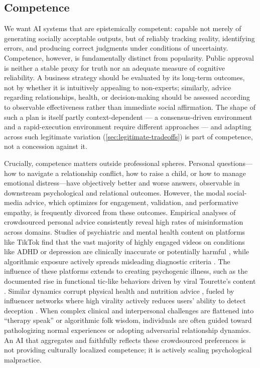 \documentclass{article}
\theoremstyle{plain}
\theoremstyle{definition}
\theoremstyle{remark}
\begin{document}
\subsection{Competence}
\label{sec:competence}
We want AI systems that are epistemically competent: capable not merely of generating socially acceptable outputs, but of reliably tracking reality, identifying errors, and producing correct judgments under conditions of uncertainty. Competence, however, is fundamentally distinct from popularity. Public approval is neither a stable proxy for truth nor an adequate measure of cognitive reliability. A business strategy should be evaluated by its long-term outcomes, not by whether it is intuitively appealing to non-experts; similarly, advice regarding relationships, health, or decision-making should be assessed according to observable effectiveness rather than immediate social affirmation. The shape of such a plan is itself partly context-dependent --- a consensus-driven environment and a rapid-execution environment require different approaches --- and adapting across such legitimate variation (\cref{sec:legitimate-tradeoffs}) is part of competence, not a concession against it. 

Crucially, competence matters outside professional spheres. Personal questions---how to navigate a relationship conflict, how to raise a child, or how to manage emotional distress---have objectively better and worse answers, observable in downstream psychological and relational outcomes. However, the modal social-media advice, which optimizes for engagement, validation, and performative empathy, is frequently divorced from these outcomes. Empirical analyses of crowdsourced personal advice consistently reveal high rates of misinformation across domains. Studies of psychiatric and mental health content on platforms like TikTok find that the vast majority of highly engaged videos on conditions like ADHD or depression are clinically inaccurate or potentially harmful \citep{yeung2022tiktok, turuba2025tiktok}, while algorithmic exposure actively spreads misleading diagnostic criteria \citep{turuba2024exploring}. The influence of these platforms extends to creating psychogenic illness, such as the documented rise in functional tic-like behaviors driven by viral Tourette's content \citep{frey2022tiktok}. Similar dynamics corrupt physical health and nutrition advice \citep{zeng2025nutrition}, fueled by influencer networks where high virality actively reduces users' ability to detect deception \citep{mulcahy2024going}. When complex clinical and interpersonal challenges are flattened into ``therapy speak'' or algorithmic folk wisdom, individuals are often guided toward pathologizing normal experiences or adopting adversarial relationship dynamics. An AI that aggregates and faithfully reflects these crowdsourced preferences is not providing culturally localized competence; it is actively scaling psychological malpractice.
\end{document}
